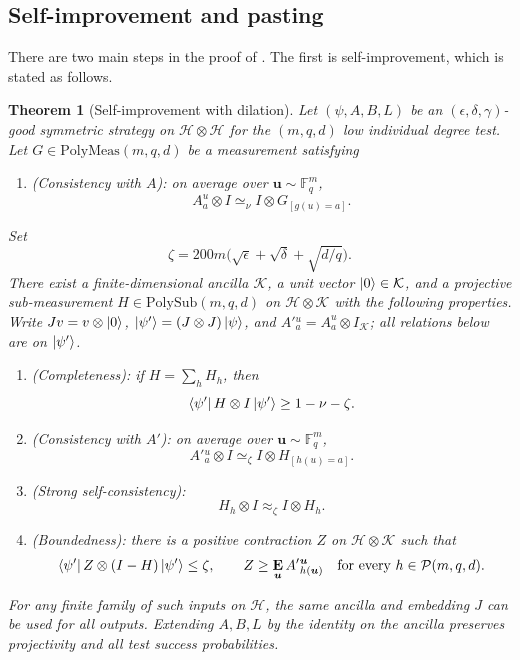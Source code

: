 \documentclass[11pt]{article}
\newtheorem{theorem}{Theorem}[section]
\theoremstyle{definition}
\newcommand{\E}{\mathop{\bf E\/}}
\newcommand{\F}{\mathbb F}
\newcommand{\eps}{\epsilon}
\newcommand{\calH}{\mathcal{H}}
\newcommand{\calP}{\mathcal{P}}
\newcommand{\bu}{\boldsymbol{u}}
\newcommand{\polyfunc}[3]{\calP(#1, #2, #3)}
\newcommand{\polymeas}[3]{\mathrm{PolyMeas}(#1, #2, #3)}
\newcommand{\polysub}[3]{\mathrm{PolySub}(#1, #2, #3)}
\begin{document}
\subsection{Self-improvement and pasting}\label{sec:self-improvement-and-pasting}

There are two main steps in the proof of .
The first is self-improvement, which is stated as follows.

\begin{theorem}[Self-improvement with dilation]\label{thm:self-improvement-in-induction-section}
Let $(\psi,A,B,L)$ be an $(\eps,\delta,\gamma)$-good symmetric
strategy on $\calH\otimes\calH$ for the $(m,q,d)$ low individual
degree test.  Let $G\in\polymeas{m}{q}{d}$ be a measurement satisfying
\begin{enumerate}
 \item (Consistency with $A$):\label{item:si-inductive-G-consistency}
 on average over $\bu\sim\F_q^m$,
 \[
 A^u_a\otimes I\simeq_\nu I\otimes G_{[g(u)=a]}.
 \]
\end{enumerate}
Set
\[
 \zeta=200m\bigl(\sqrt\eps+\sqrt\delta+\sqrt{d/q}\bigr).
\]
There exist a finite-dimensional ancilla $\mathcal K$, a unit vector
$\ket0\in\mathcal K$, and a projective sub-measurement
$H\in\polysub{m}{q}{d}$ on $\calH\otimes\mathcal K$ with the
following properties.  Write $Jv=v\otimes\ket0$,
$\ket{\psi'}=(J\otimes J)\ket\psi$, and
$A'{}^u_a=A^u_a\otimes I_{\mathcal K}$; all relations below are on
$\ket{\psi'}$.
\begin{enumerate}
 \item (Completeness):\label{item:si-inductive-completeness}
 if $H=\sum_hH_h$, then
 \[
 \bra{\psi'}H\otimes I\ket{\psi'}\geq1-\nu-\zeta.
 \]
 \item (Consistency with $A'$):\label{item:si-inductive-A-consistency}
 on average over $\bu\sim\F_q^m$,
 \[
 A'{}^u_a\otimes I\simeq_\zeta I\otimes H_{[h(u)=a]}.
 \]
 \item (Strong self-consistency):\label{item:si-inductive-self}
 \[
 H_h\otimes I\approx_\zeta I\otimes H_h.
 \]
 \item (Boundedness):\label{item:si-inductive-boundedness}
 there is a positive contraction $Z$ on $\calH\otimes\mathcal K$ such that
 \[
 \bra{\psi'}Z\otimes(I-H)\ket{\psi'}\leq\zeta,
 \qquad
 Z\geq\E_{\bu}A'{}^{\bu}_{h(\bu)}
 \quad\text{for every }h\in\polyfunc{m}{q}{d}.
 \]
\end{enumerate}
For any finite family of such inputs on $\calH$, the same ancilla and
embedding $J$ can be used for all outputs.  Extending $A,B,L$ by the
identity on the ancilla preserves projectivity and all test success
probabilities.
\end{theorem}
\end{document}
